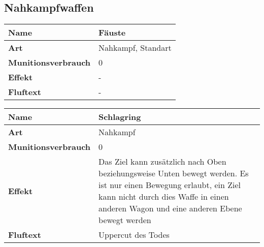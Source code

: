 \subsection{Nahkampfwaffen}


\begin{table}[H]
  \begin{center}
    \label{tab:table1}
    \begin{tabular}{|l|p{8cm}|}
      \hline
      \textbf{Name} & Fäuste \\
      \hline
      \textbf{Art} & Nahkampf, Standart \\
      \hline
      \textbf{Munitionsverbrauch} & 0 \\
      \hline
      \textbf{Effekt} & - \\
      \hline
      \textbf{Fluftext} & - \\
      \hline
    \end{tabular}
  \end{center}
\end{table}


\begin{table}[H]
  \begin{center}
    \label{tab:table1}
    \begin{tabular}{|l|p{8cm}|}
      \hline
      \textbf{Name} & Schlagring \\
      \hline
      \textbf{Art} & Nahkampf \\
      \hline
      \textbf{Munitionsverbrauch} & 0 \\
      \hline
      \textbf{Effekt} & Das Ziel kann zusätzlich nach Oben beziehungsweise Unten bewegt werden. Es ist nur
                        einen Bewegung erlaubt, ein Ziel kann nicht durch dies Waffe in einen anderen Wagon
                        und eine anderen Ebene bewegt werden \\
      \hline
      \textbf{Fluftext} & Uppercut des Todes \\
      \hline
    \end{tabular}
  \end{center}
\end{table}

